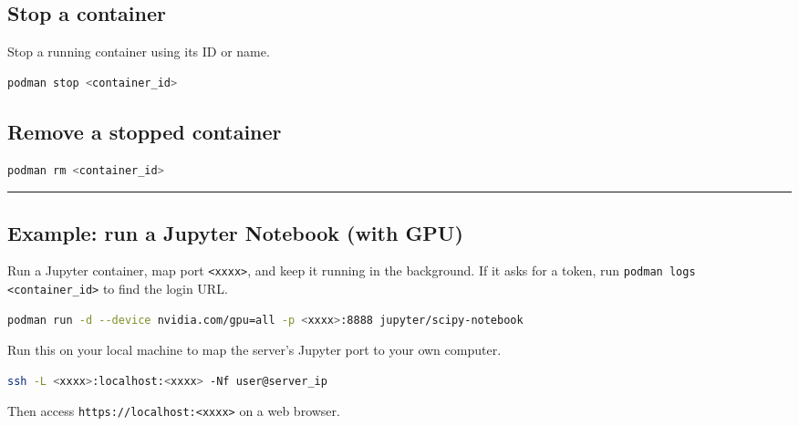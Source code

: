 \documentclass[a4paper, landscape]{article}
\begin{document}
\begin{multicols}{2}
\subsection*{Stop a container}
\label{sec:orga8996c7}
Stop a running container using its ID or name.
\begin{lstlisting}[language=sh,numbers=none]
podman stop <container_id>
\end{lstlisting}
\subsection*{Remove a stopped container}
\label{sec:org2310352}
\begin{lstlisting}[language=sh,numbers=none]
podman rm <container_id>
\end{lstlisting}
\vspace{-0.25em}\noindent\rule{\linewidth}{0.4pt}\vspace{-0.25em}
\subsection*{Example: run a Jupyter Notebook (with GPU)}
\label{sec:orgdf240df}
\vspace{0.5em}
Run a Jupyter container, map port \texttt{<xxxx>}, and keep it running in the background.
\newline
If it asks for a token, run \texttt{podman logs <container\_id>} to find the login URL.
\begin{lstlisting}[language=sh,numbers=none]
podman run -d --device nvidia.com/gpu=all -p <xxxx>:8888 jupyter/scipy-notebook
\end{lstlisting}
Run this on your local machine to map the server's Jupyter port to your own computer.
\begin{lstlisting}[language=sh,numbers=none]
ssh -L <xxxx>:localhost:<xxxx> -Nf user@server_ip
\end{lstlisting}
Then access \texttt{https://localhost:<xxxx>} on a web browser.
\end{multicols}
\end{document}
